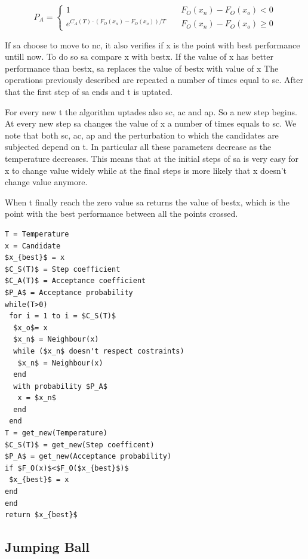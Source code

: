 \documentclass[journal]{IEEEtran}
\begin{document}
 \begin{equation}
 	\label{accept_prob}
	P_A = \begin{cases}
		1 & \quad F_O (x_n)-F_O (x_o) < 0 \\
		e^{ C_A(T)  \cdot(F_O (x_n)-F_O (x_o))/T } & \quad F_O (x_n)-F_O(x_o) \geq 0
\end{cases}
 \end{equation}

If \gls{sa} choose to move to \gls{nc}, it also verifies if \gls{x} is the point with best performance untill now. To do so \gls{sa} compare \gls{x} with \gls{bestx}. If the value of \gls{x} has better performance than \gls{bestx}, \gls{sa} replaces the value of \gls{bestx} with value of \gls{x} The operations previously described are repeated a number of times equal to \gls{sc}. After that the first step of \gls{sa} ends and \gls{t} is uptated.

For every new \gls{t} the algorithm uptades also \gls{sc}, \gls{ac} and \gls{ap}. So a new step begins. At every new step \gls{sa} changes the value of \gls{x} a number of times equals to \gls{sc}. We note that both \gls{sc}, \gls{ac}, \gls{ap} and the perturbation to which the candidates are subjected depend on \gls{t}. In particular all these parameters decrease as the temperature decreases. This means that at the initial steps of \gls{sa} is very easy for \gls{x} to change value widely while at the final steps is more likely that \gls{x} doesn't change value anymore.

When \gls{t} finally reach the zero value \gls{sa} returns the value of \gls{bestx}, which is the point with the best performance between all the points crossed.

\begin{lstlisting}[mathescape=true,frame=single]
T = Temperature
x = Candidate
$x_{best}$ = x
$C_S(T)$ = Step coefficient
$C_A(T)$ = Acceptance coefficient
$P_A$ = Acceptance probability
while(T>0)
 for i = 1 to i = $C_S(T)$
  $x_o$= x
  $x_n$ = Neighbour(x)
  while ($x_n$ doesn't respect costraints)
   $x_n$ = Neighbour(x)
  end
  with probability $P_A$
   x = $x_n$
  end
 end
T = get_new(Temperature)
$C_S(T)$ = get_new(Step coefficent)
$P_A$ = get_new(Acceptance probability)
if $F_O(x)$<$F_O($x_{best}$)$
 $x_{best}$ = x
end
end
return $x_{best}$
\end{lstlisting}  \label{code_sa}

\subsection{Jumping Ball}
\end{document}
